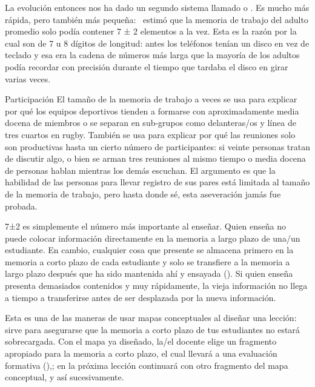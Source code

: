 La evolución entonces nos ha dado un segundo sistema
llamado 
o .
Es mucho más rápida,
pero también más pequeña:~\cite{Mill1956} estimó que la memoria de trabajo del adulto promedio solo podía contener 7 ± 2 elementos a la vez.
Esta es la razón por la cual 
son de 7 u 8 dígitos de longitud:
antes los teléfonos tenían un disco en vez de teclado y
esa era la cadena de números más larga que la mayoría de los adultos podía recordar con precisión durante el tiempo que tardaba el disco en girar varias veces.

\begin{aside}{Participación}
  El tamaño de la memoria de trabajo a veces se usa para explicar por qué los equipos 
  deportivos tienden a formarse con aproximadamente media docena de miembros o
  se separan en sub-grupos como delanteras/os y línea de tres cuartos en rugby.
  También se usa para explicar por qué las reuniones solo son productivas hasta un cierto número de participantes:
si veinte personas tratan de discutir algo,
o bien se arman tres reuniones al mismo tiempo
o media docena de personas hablan mientras los demás escuchan.
El argumento es que la habilidad de las personas para llevar registro de sus pares está limitada al tamaño de la memoria de trabajo,
pero hasta donde sé,
esta aseveración jamás fue probada.
\end{aside}

7±2 es simplemente el número más importante al enseñar.
Quien enseña no puede colocar información directamente en la memoria a largo plazo de una/un estudiante.
En cambio,
cualquier cosa que presente se almacena primero en la memoria a corto plazo de cada estudiante
y solo se transfiere a la memoria a largo plazo después que ha sido mantenida ahí y ensayada ().
Si quien enseña presenta demasiados contenidos y muy rápidamente,
la vieja información no llega a tiempo a transferirse antes de ser desplazada por la nueva información.

Esta es una de las maneras de usar mapas conceptuales al diseñar una lección:
sirve para asegurarse que la memoria a corto plazo de tus estudiantes no estará sobrecargada.
Con el mapa ya diseñado,
la/el docente elige un fragmento apropiado para la memoria a corto plazo, el cual llevará a una evaluación formativa (),; en la próxima lección continuará con otro fragmento del mapa conceptual, y así sucesivamente.

